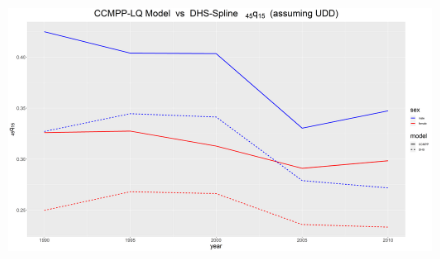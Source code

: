 \documentclass[12pt,a4paper]{article}
\begin{document}
\begin{figure}[H]
\includegraphics[width=\linewidth]{Burkina Faso/compare DHS q4515.png}
\end{figure}
\end{document}
